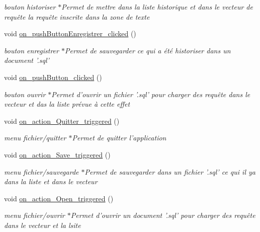\begin{DoxyCompactItemize}
\begin{DoxyCompactList}\small\item\em bouton historiser $\ast$\-Permet de mettre dans la liste historique et dans le vecteur de requête la requête inscrite dans la zone de texte \end{DoxyCompactList}\item 
void \hyperlink{class_main_window_a673e50dcdf9b19caf39cd0c9fc56bde1}{on\-\_\-push\-Button\-Enregistrer\-\_\-clicked} ()
\begin{DoxyCompactList}\small\item\em bouton enregistrer $\ast$\-Permet de sauvegarder ce qui a été historiser dans un document '.sql' \end{DoxyCompactList}\item 
void \hyperlink{class_main_window_a4de79c63c7fa0b8d7c468ac71f20be81}{on\-\_\-push\-Button\-\_\-clicked} ()
\begin{DoxyCompactList}\small\item\em bouton ouvrir $\ast$\-Permet d'ouvrir un fichier '.sql' pour charger des requête dans le vecteur et das la liste prévue à cette effet \end{DoxyCompactList}\item 
void \hyperlink{class_main_window_add2e908bb2749656382371387aee1925}{on\-\_\-action\-\_\-\-Quitter\-\_\-triggered} ()
\begin{DoxyCompactList}\small\item\em menu fichier/quitter $\ast$\-Permet de quitter l'application \end{DoxyCompactList}\item 
void \hyperlink{class_main_window_a632c187ea7c5c0ceb9ffc7977da06f97}{on\-\_\-action\-\_\-\-Save\-\_\-triggered} ()
\begin{DoxyCompactList}\small\item\em menu fichier/sauvegarde $\ast$\-Permet de sauvegarder dans un fichier '.sql' ce qui il ya dans la liste et dans le vecteur \end{DoxyCompactList}\item 
void \hyperlink{class_main_window_a2ea16d8091291492f27f21c77a67b25a}{on\-\_\-action\-\_\-\-Open\-\_\-triggered} ()
\begin{DoxyCompactList}\small\item\em menu fichier/ouvrir $\ast$\-Permet d'ouvrir un document '.sql' pour charger des requête dans le vecteur et la lsite \end{DoxyCompactList}\item 

\end{DoxyCompactItemize}

